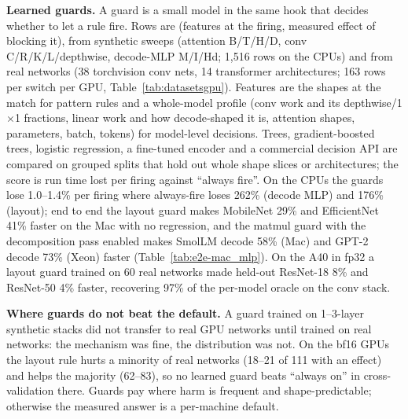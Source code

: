 \label{sec:guards}
\textbf{Learned guards.} A guard is a small model in the same  hook that decides whether to let a
rule fire. Rows are (features at the firing, measured effect of blocking it), from synthetic sweeps (attention B/T/H/D,
conv C/R/K/L/depthwise, decode-MLP M/I/Hd; 1,516 rows on the CPUs) and from real networks (38 torchvision conv nets,
14 transformer architectures; 163 rows per switch per GPU, Table~\ref{tab:datasetsgpu}). Features are the shapes at
the match for pattern rules and a whole-model profile (conv work and its depthwise/1$\times$1 fractions, linear work
and how decode-shaped it is, attention shapes, parameters, batch, tokens) for model-level decisions. Trees,
gradient-boosted trees, logistic regression, a fine-tuned encoder and a commercial decision API are compared on grouped
splits that hold out whole shape slices or architectures; the score is run time lost per firing against
``always fire''. On the CPUs the guards lose 1.0--1.4\% per firing where always-fire loses 262\% (decode MLP) and
176\% (layout); end to end the layout guard makes MobileNet 29\% and EfficientNet 41\% faster on the Mac with no
regression, and the matmul guard with the decomposition pass enabled makes SmolLM decode 58\% (Mac) and GPT-2 decode
73\% (Xeon) faster (Table~\ref{tab:e2e-mac_mlp}). On the A40 in fp32 a layout guard trained on 60 real networks made
held-out ResNet-18 8\% and ResNet-50 4\% faster, recovering 97\% of the per-model oracle on the conv stack.




\textbf{Where guards do not beat the default.} A guard trained on 1--3-layer synthetic stacks did not transfer to real
GPU networks until trained on real networks: the mechanism was fine, the distribution was not. On the bf16 GPUs the
layout rule hurts a minority of real networks (18--21 of 111 with an effect) and helps the majority (62--83), so no
learned guard beats ``always on'' in cross-validation there. Guards pay where harm is frequent and shape-predictable;
otherwise the measured answer is a per-machine default.

